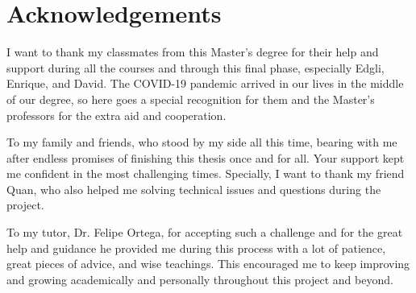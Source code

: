 \documentclass[a4paper, 12pt]{book}
\begin{document}



\chapter*{Acknowledgements}




I want to thank my classmates from this Master's degree for their help and support during all the courses and through this final phase, especially Edgli, Enrique, and David. The COVID-19 pandemic arrived in our lives in the middle of our degree, so here goes a special recognition for them and the Master's professors for the extra aid and cooperation.

To my family and friends, who stood by my side all this time, bearing with me after endless promises of finishing this thesis once and for all. Your support kept me confident in the most challenging times. Specially, I want to thank my friend Quan, who also helped me solving technical issues and questions during the project.

To my tutor, Dr. Felipe Ortega, for accepting such a challenge and for the great help and guidance he provided me during this process with a lot of patience, great pieces of advice, and wise teachings. This encouraged me to keep improving and growing academically and personally throughout this project and beyond.
\end{document}
